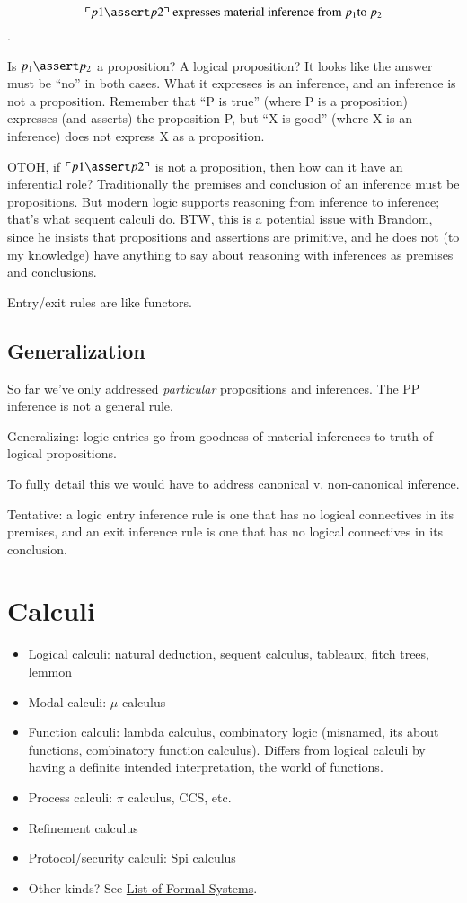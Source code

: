 \documentclass{article}
\begin{document}
\[\ulcorner p1\linfer p2\urcorner\ \text{expresses
material inference from}\ p_1 \text{to}\ p_2\].

Is \(p_1\linfer p_2\) a proposition? A logical proposition? It looks like
the answer must be ``no'' in both cases. What it expresses is an
inference, and an inference is not a proposition. Remember that ``P is
true'' (where P is a proposition) expresses (and asserts) the
proposition P, but ``X is good'' (where X is an inference) does not
express X as a proposition.

OTOH, if \(\ulcorner p1\linfer p2\urcorner\) is not a proposition, then
how can it have an inferential role? Traditionally the premises and
conclusion of an inference must be propositions. But modern logic
supports reasoning from inference to inference; that's what sequent
calculi do. BTW, this is a potential issue with Brandom, since he
insists that propositions and assertions are primitive, and he does
not (to my knowledge) have anything to say about reasoning with
inferences as premises and conclusions.

Entry/exit rules are like functors.

\subsection{Generalization}

So far we've only addressed \textit{particular} propositions and
inferences.  The PP inference is not a general rule.

Generalizing: logic-entries go from goodness of material inferences to
truth of logical propositions.

To fully detail this we would have to address canonical v.
non-canonical inference.

Tentative: a logic entry inference rule is one that has no logical
connectives in its premises, and an exit inference rule is one that
has no logical connectives in its conclusion.


\section{Calculi}

\begin{itemize}
\item Logical calculi: natural deduction, sequent calculus, tableaux, fitch trees, lemmon
\item Modal calculi: \(\mu\)-calculus
\item Function calculi: lambda calculus, combinatory logic (misnamed, its
about functions, combinatory function calculus). Differs from logical
calculi by having a definite intended interpretation, the world of
functions.
\item Process calculi: \(\pi\) calculus, CCS, etc.
\item Refinement calculus
\item Protocol/security calculi: Spi calculus
\item Other kinds?  See \href{https://en.wikipedia.org/wiki/List_of_formal_systems}{List of Formal Systems}.
\end{itemize}
\end{document}
